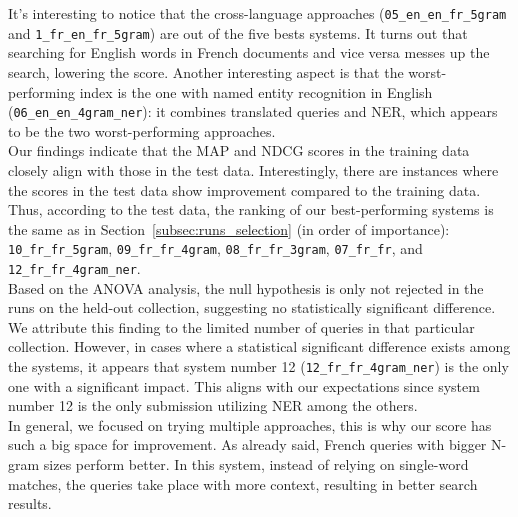 It's interesting to notice that the cross-language approaches (\texttt{05\_en\_en\_fr\_5gram} and
\texttt{1\_fr\_en\_fr\_5gram}) are out of the five bests systems.
It turns out that searching for English words in French documents and vice versa messes up the search, lowering the
score.
Another interesting aspect is that the worst-performing index is the one with named entity recognition in English
(\texttt{06\_en\_en\_4gram\_ner}): it combines translated queries and NER, which appears to be the two worst-performing
approaches.\\

Our findings indicate that the MAP and NDCG scores in the training data closely align with those in the test data.
Interestingly, there are instances where the scores in the test data show improvement compared to the training data.
Thus, according to the test data, the ranking of our best-performing systems is the same as in
Section~\ref{subsec:runs_selection} (in order of importance): \texttt{10\_fr\_fr\_5gram},
\texttt{09\_fr\_fr\_4gram}, \texttt{08\_fr\_fr\_3gram}, \texttt{07\_fr\_fr}, and \texttt{12\_fr\_fr\_4gram\_ner}.\\

Based on the ANOVA analysis, the null hypothesis is only not rejected in the runs on the held-out collection, suggesting
no statistically significant difference.
We attribute this finding to the limited number of queries in that particular collection.
However, in cases where a statistical significant difference exists among the systems, it appears that system number 12
(\texttt{12\_fr\_fr\_4gram\_ner}) is the only one with a significant impact.
This aligns with our expectations since system number 12 is the only submission utilizing NER among the others.\\

In general, we focused on trying multiple approaches, this is why our score has such a big space for improvement.
As already said, French queries with bigger N-gram sizes perform better.
In this system, instead of relying on single-word matches, the queries take place with more context, resulting in better
search results.\\